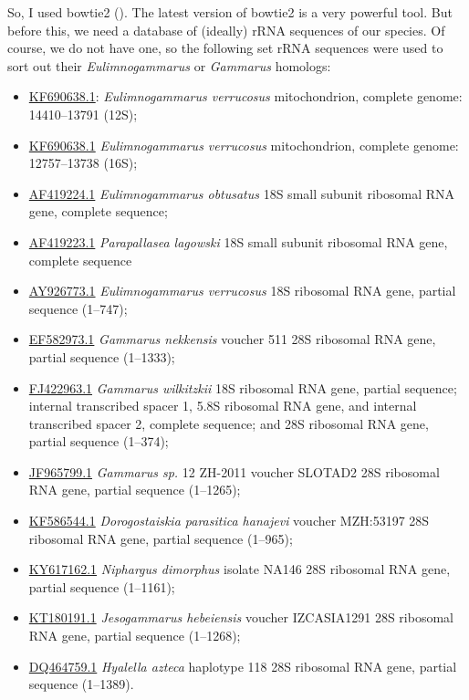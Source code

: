 \documentclass[12pt]{article}
\begin{document}
So, I used bowtie2 (\cite{Langmead2012}). The latest version of bowtie2 is a very powerful tool. 
But before this, we need a database of (ideally) rRNA sequences of our species. Of course, we do not have one, so the following set rRNA sequences were used to sort out their \textit{Eulimnogammarus} or \textit{Gammarus} homologs: 
		\begin{itemize}
		\item \href{https://www.ncbi.nlm.nih.gov/nuccore/KF690638.1}{KF690638.1}: \textit{Eulimnogammarus verrucosus} mitochondrion, complete genome: 14410--13791 (12S);
		\item \href{https://www.ncbi.nlm.nih.gov/nuccore/KF690638.1}{KF690638.1} \textit{Eulimnogammarus verrucosus} mitochondrion, complete genome: 12757--13738 (16S);
		\item \href{https://www.ncbi.nlm.nih.gov/nuccore/AF419224.1}{AF419224.1} \textit{Eulimnogammarus obtusatus} 18S small subunit ribosomal RNA gene, complete sequence; 
		\item \href{https://www.ncbi.nlm.nih.gov/nuccore/AF419223.1}{AF419223.1} \textit{Parapallasea lagowski} 18S small subunit ribosomal RNA gene, complete sequence
		\item \href{https://www.ncbi.nlm.nih.gov/nuccore/AY926773.1}{AY926773.1} \textit{Eulimnogammarus verrucosus} 18S ribosomal RNA gene, partial sequence (1--747); 
		\item \href{https://www.ncbi.nlm.nih.gov/nuccore/EF582973.1}{EF582973.1} \textit{Gammarus nekkensis} voucher 511 28S ribosomal RNA gene, partial sequence (1--1333);
		\item \href{https://www.ncbi.nlm.nih.gov/nuccore/FJ422963.1}{FJ422963.1} \textit{Gammarus wilkitzkii} 18S ribosomal RNA gene, partial sequence; internal transcribed spacer 1, 5.8S ribosomal RNA gene, and internal transcribed spacer 2, complete sequence; and 28S ribosomal RNA gene, partial sequence (1--374);
		\item \href{https://www.ncbi.nlm.nih.gov/nuccore/JF965799.1}{JF965799.1} \textit{Gammarus sp.} 12 ZH-2011 voucher SLOTAD2 28S ribosomal RNA gene, partial sequence (1--1265); 
		\item \href{https://www.ncbi.nlm.nih.gov/nuccore/KF586544.1}{KF586544.1} \textit{Dorogostaiskia parasitica hanajevi} voucher MZH:53197 28S ribosomal RNA gene, partial sequence (1--965);
		\item \href{https://www.ncbi.nlm.nih.gov/nuccore/KY617162.1}{KY617162.1} \textit{Niphargus dimorphus} isolate NA146 28S ribosomal RNA gene, partial sequence (1--1161);
		\item \href{https://www.ncbi.nlm.nih.gov/nuccore/KT180191.1}{KT180191.1} \textit{Jesogammarus hebeiensis} voucher IZCASIA1291 28S ribosomal RNA gene, partial sequence (1--1268);
		\item \href{https://www.ncbi.nlm.nih.gov/nuccore/DQ464759.1}{DQ464759.1} \textit{Hyalella azteca} haplotype 118 28S ribosomal RNA gene, partial sequence (1--1389).
		\end{itemize}
\end{document}
